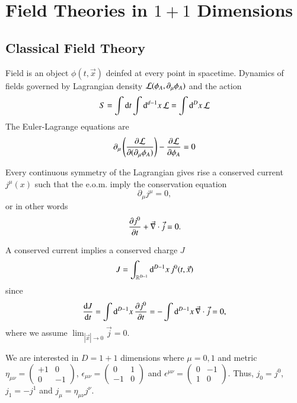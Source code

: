 \chapter{Field Theories in $1+1$ Dimensions}

\section{Classical Field Theory}
Field is an object $\phi(t, \vec{x})$ deinfed at every point in spacetime. Dynamics of fields governed by Lagrangian density $\mathcal{L} (\phi_A, \partial_\mu \phi_A)$ and the action
\begin{equation*}
	S = \int \dd{t} \int \dd[d-1]{x} \mathcal{L} = \int \dd[D]{x} \mathcal{L}
\end{equation*}
The Euler-Lagrange equations are
\begin{equation*}
	\partial_\mu \left( \pdv{\mathcal{L}}{(\partial_\mu \phi_A)} \right)  - \pdv{\mathcal{L}}{\phi_A} = 0
\end{equation*}

Every continuous symmetry of the Lagrangian gives rise a conserved current $j^{\mu}(x)$ such that the e.o.m. imply the conservation equation
\begin{equation}
	\partial_\mu j^{\mu} = 0,
	\label{math:5.1}
\end{equation}
or in other words
\begin{equation*}
	\pdv{j^{0}}{t} + \vec{\nabla} \cdot \vec{j} = 0.
\end{equation*}

A conserved current implies a conserved charge $J$
\begin{equation}
	J = \int_{\mathbb{R}^{D-1}} \dd[D-1]{x} j^0(t, \vec{x})
\end{equation}
since 
\begin{align*}
	\dv{J}{t} = \int \dd[D-1]{x} \pdv{j^0}	{t} = - \int \dd[D-1]{x} \vec{\nabla} \cdot \vec{j} = 0,
\end{align*}
where we assume $\lim_{|\vec{x}|\rightarrow 0} \vec{j} = 0$.

We are interested in $D=1 + 1$ dimensions where $\mu = 0, 1$ and metric $\eta_{\mu\nu} = \begin{pmatrix} +1 & 0 \\ 0 & -1 \end{pmatrix}$, $\epsilon_{\mu\nu} = \begin{pmatrix} 0 & 1 \\ -1 & 0\end{pmatrix}$ and $\epsilon^{\mu\nu} = \begin{pmatrix} 0 & -1 \\ 1 & 0\end{pmatrix}$. Thus, $j_0 = j^0$, $j_1 = - j^1$ and $j_\mu = \eta_{\mu\nu} j^\nu$.

